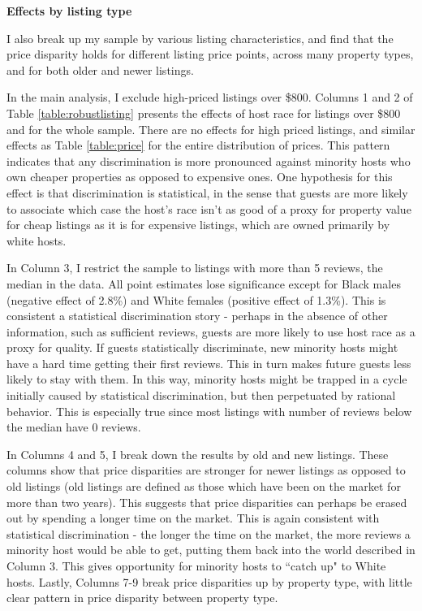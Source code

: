 \textbf{Effects by listing type}

I also break up my sample by various listing characteristics, and find that the price disparity holds for different listing price points, across many property types, and for both older and newer listings. 

In the main analysis, I exclude high-priced listings over \$800. Columns 1 and 2 of Table \ref{table:robustlisting} presents the effects of host race for listings over \$800 and for the whole sample. There are no effects for high priced listings, and similar effects as Table \ref{table:price} for the entire distribution of prices. This pattern indicates that any discrimination is more pronounced against minority hosts who own cheaper properties as opposed to expensive ones. One hypothesis for this effect is that discrimination is statistical, in the sense that guests are more likely to associate which case the host's race isn't as good of a proxy for property value for cheap listings as it is for expensive listings, which are owned primarily by white hosts.

In Column 3, I restrict the sample to listings with more than 5 reviews, the median in the data. All point estimates lose significance except for Black males (negative effect of 2.8\%) and White females (positive effect of 1.3\%). This is consistent a statistical discrimination story - perhaps in the absence of other information, such as sufficient reviews, guests are more likely to use host race as a proxy for quality. If guests statistically discriminate, new minority hosts might have a hard time getting their first reviews. This in turn makes future guests less likely to stay with them. In this way, minority hosts might be trapped in a cycle initially caused by statistical discrimination, but then perpetuated by rational behavior. This is especially true since most listings with number of reviews below the median have 0 reviews. 

In Columns 4 and 5, I break down the results by old and new listings. These columns show that price disparities are stronger for newer listings as opposed to old listings (old listings are defined as those which have been on the market for more than two years). This suggests that price disparities can perhaps be erased out by spending a longer time on the market. This is again consistent with statistical discrimination - the longer the time on the market, the more reviews a minority host would be able to get, putting them back into the world described in Column 3. This gives opportunity for minority hosts to ``catch up" to White hosts. Lastly, Columns 7-9 break price disparities up by property type, with little clear pattern in price disparity between property type. 






